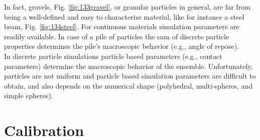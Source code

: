 % 
% 

In fact, gravels, Fig. \ref{fig:133gravel}, or granular particles in
general, are far from being a well-defined and easy to characterize material,
like for instance a steel beam, Fig.
\ref{fig:134steel}. For continuous materials simulation
parameters are readily available.
In case of a pile of particles the sum of discrete particle properties determines the pile's macroscopic behavior 
(e.g., angle of repose).\\
In discrete particle simulations particle based parameters (e.g., contact
parameters) determine the macroscopic behavior of the ensemble.
Unfortunately, particles are not uniform and particle based simulation
parameters are difficult to obtain, and also depends on the numerical shape
(polyhedral, multi-spheres, and simple spheres).

\section{Calibration}
\label{sec:calibration}

